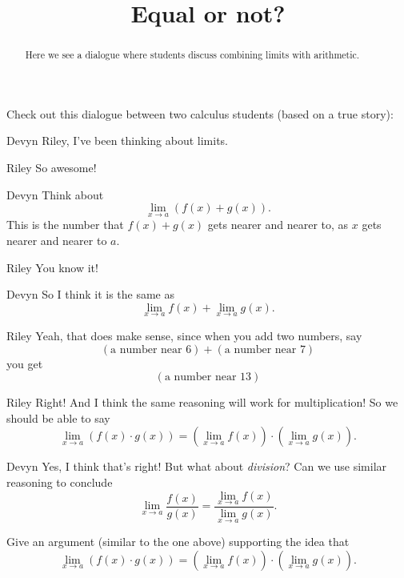\documentclass{ximera}
\title[Break-Ground:]{Equal or not?}
\begin{document}
\begin{abstract}
Here we see a dialogue where students discuss combining limits with
arithmetic.
\end{abstract}
\maketitle


Check out this dialogue between two calculus students (based on a true
story):

\begin{dialogue}
\item[Devyn] Riley, I've been thinking about limits.
\item[Riley] So awesome!
\item[Devyn] Think about
  \[
  \displaystyle\lim_{x\to a} \left(f(x) + g(x)\right).
  \]
  This is the number that $f(x) + g(x)$ gets nearer and nearer to, as $x$ gets nearer and nearer to $a$. 
\item[Riley] You know it!
\item[Devyn] So I think it is the same as
  \[
  \displaystyle\lim_{x\to a} f(x) + \displaystyle\lim_{x\to a}g(x).
  \]
\item[Riley] Yeah, that does make sense, since when you add two
  numbers, say
  \[
  (\text{a number near $6$}) + (\text{a number near $7$})
  \]
  you get
  \[
  (\text{a number near $13$})
  \]
\item[Riley] Right! And I think the same reasoning will work for
  multiplication! So we should be able to say
  \[
  \displaystyle\lim_{x\to a}\left(f(x) \cdot g(x)\right) = \left(\displaystyle\lim_{x\to a} f(x) \right)\cdot\left(\displaystyle\lim_{x\to a} g(x)\right).
  \]
\item[Devyn] Yes, I think that's right! But what about
  \textit{division}? Can we use similar reasoning to conclude
  \[
  \displaystyle\lim_{x\to a} \frac{f(x)}{g(x)} = \frac{\displaystyle\lim_{x\to a}
    f(x)}{\displaystyle\lim_{x\to a} g(x)}.
  \]
\end{dialogue}



\begin{problem}
  Give an argument (similar to the one above) supporting the idea that
  \[
  \displaystyle\lim_{x\to a}\left(f(x) \cdot g(x)\right) = \left(\displaystyle\lim_{x\to a} f(x) \right)\cdot\left(\displaystyle\lim_{x\to a} g(x)\right).
  \]
  \begin{freeResponse}
  \end{freeResponse}
\end{problem}
\end{document}

